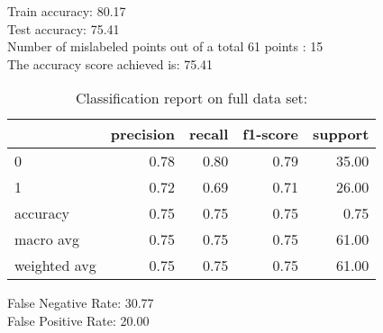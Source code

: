 Train accuracy: 80.17%
\\Test accuracy: 75.41%
\\Number of mislabeled points out of a total 61 points : 15
\\The accuracy score achieved is: 75.41 %
\begin{table}[H]
\caption{Classification report on full data set:}
\begin{center}
\begin{tabular}{lrrrr}
\toprule
{} &  precision &  recall &  f1-score &  support \\
\midrule
0            &       0.78 &    0.80 &      0.79 &    35.00 \\
1            &       0.72 &    0.69 &      0.71 &    26.00 \\
accuracy     &       0.75 &    0.75 &      0.75 &     0.75 \\
macro avg    &       0.75 &    0.75 &      0.75 &    61.00 \\
weighted avg &       0.75 &    0.75 &      0.75 &    61.00 \\
\bottomrule
\end{tabular}

\label{naive_bayes_class}
\end{center}
\end{table}
\noindent
False Negative Rate: 30.77
\\False Positive Rate: 20.00
